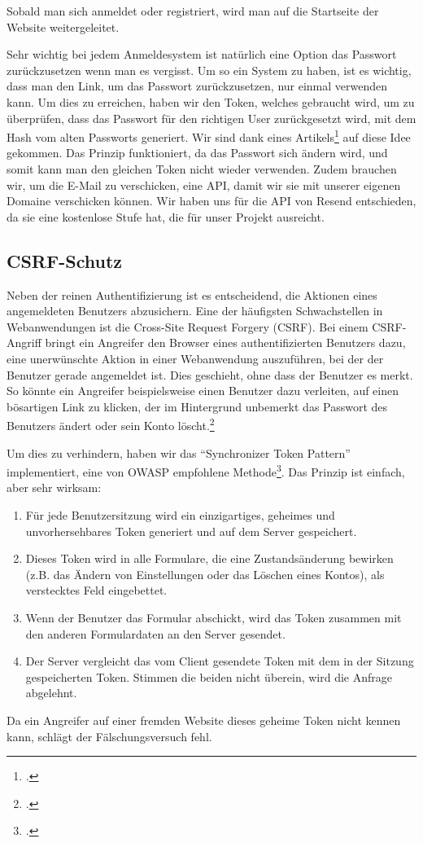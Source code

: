 \documentclass[12pt,a4paper]{report}
\begin{document}
Sobald man sich anmeldet oder registriert, wird man auf die Startseite der Website weitergeleitet.

Sehr wichtig bei jedem Anmeldesystem ist natürlich eine Option das Passwort zurückzusetzen wenn man es vergisst. Um so ein System zu haben, ist es wichtig, dass man den Link, um das Passwort zurückzusetzen, nur einmal verwenden kann. Um dies zu erreichen, haben wir den Token, welches gebraucht wird, um zu überprüfen, dass das Passwort für den richtigen User zurückgesetzt wird, mit dem Hash vom alten Passworts generiert. Wir sind dank eines Artikels\footcite{password_reset} auf diese Idee gekommen. Das Prinzip funktioniert, da das Passwort sich ändern wird, und somit kann man den gleichen Token nicht wieder verwenden. Zudem brauchen wir, um die E-Mail zu verschicken, eine API, damit wir sie mit unserer eigenen Domaine verschicken können. Wir haben uns für die API von Resend entschieden, da sie eine kostenlose Stufe hat, die für unser Projekt ausreicht.


\subsection{CSRF-Schutz}
Neben der reinen Authentifizierung ist es entscheidend, die Aktionen eines angemeldeten Benutzers abzusichern. Eine der häufigsten Schwachstellen in Webanwendungen ist die Cross-Site Request Forgery (CSRF). Bei einem CSRF-Angriff bringt ein Angreifer den Browser eines authentifizierten Benutzers dazu, eine unerwünschte Aktion in einer Webanwendung auszuführen, bei der der Benutzer gerade angemeldet ist. Dies geschieht, ohne dass der Benutzer es merkt. So könnte ein Angreifer beispielsweise einen Benutzer dazu verleiten, auf einen bösartigen Link zu klicken, der im Hintergrund unbemerkt das Passwort des Benutzers ändert oder sein Konto löscht.\footcite{TestDriven_CSRF}

Um dies zu verhindern, haben wir das \enquote{Synchronizer Token Pattern} implementiert, eine von OWASP empfohlene Methode\footcite{OWASP_CSRF}. Das Prinzip ist einfach, aber sehr wirksam:
\begin{enumerate}
    \item Für jede Benutzersitzung wird ein einzigartiges, geheimes und unvorhersehbares Token generiert und auf dem Server gespeichert.
    \item Dieses Token wird in alle Formulare, die eine Zustandsänderung bewirken (z.B. das Ändern von Einstellungen oder das Löschen eines Kontos), als verstecktes Feld eingebettet.
    \item Wenn der Benutzer das Formular abschickt, wird das Token zusammen mit den anderen Formulardaten an den Server gesendet.
    \item Der Server vergleicht das vom Client gesendete Token mit dem in der Sitzung gespeicherten Token. Stimmen die beiden nicht überein, wird die Anfrage abgelehnt.
\end{enumerate}
Da ein Angreifer auf einer fremden Website dieses geheime Token nicht kennen kann, schlägt der Fälschungsversuch fehl.
\end{document}
